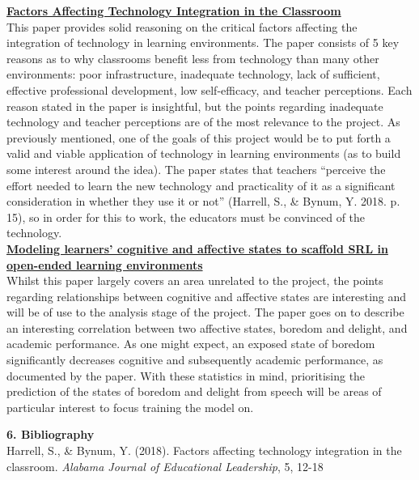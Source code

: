 \documentclass[12pt]{article}
\begin{document}
\noindent \href{https://files.eric.ed.gov/fulltext/EJ1194723.pdf}{\textbf{Factors Affecting Technology Integration in the Classroom}}
\\
This paper provides solid reasoning on the critical factors affecting the integration of technology in learning environments. The paper consists of 5 key reasons as to why classrooms benefit less from technology than many other environments: poor infrastructure, inadequate technology, lack of sufficient, effective professional development, low self-efficacy, and teacher perceptions. Each reason stated in the paper is insightful, but the points regarding inadequate technology and teacher perceptions are of the most relevance to the project. As previously mentioned, one of the goals of this project would be to put forth a valid and viable application of technology in learning environments (as to build some interest around the idea). The paper states that teachers ``perceive the effort needed to learn the new technology and practicality of it as a significant consideration in whether they use it or not'' (Harrell, S., \& Bynum, Y. 2018. p. 15), so in order for this to work, the educators must be convinced of the technology.
\\

\noindent \href{https://www.researchgate.net/profile/Ryan-Baker-2/publication/326217846_Modeling_Learners'_Cognitive_and_Affective_States_to_Scaffold_SRL_in_Open-Ended_Learning_Environments/links/5b560a4245851507a7c3f516/Modeling-Learners-Cognitive-and-Affective-States-to-Scaffold-SRL-in-Open-Ended-Learning-Environments.pdf}{\textbf{Modeling learners' cognitive and affective states to scaffold SRL in open-ended learning environments}}
\\
Whilst this paper largely covers an area unrelated to the project, the points regarding relationships between cognitive and affective states are interesting and will be of use to the analysis stage of the project. The paper goes on to describe an interesting correlation between two affective states, boredom and delight, and academic performance. As one might expect, an exposed state of boredom significantly decreases cognitive and subsequently academic performance, as documented by the paper. With these statistics in mind, prioritising the prediction of the states of boredom and delight from speech will be areas of particular interest to focus training the model on.

\pagebreak
\noindent \textbf{6. Bibliography}
\\
\noindent Harrell, S., \& Bynum, Y. (2018). Factors affecting technology integration in the \tab \tab classroom. \textit{Alabama Journal of Educational Leadership}, 5, 12-18
\\
\end{document}
